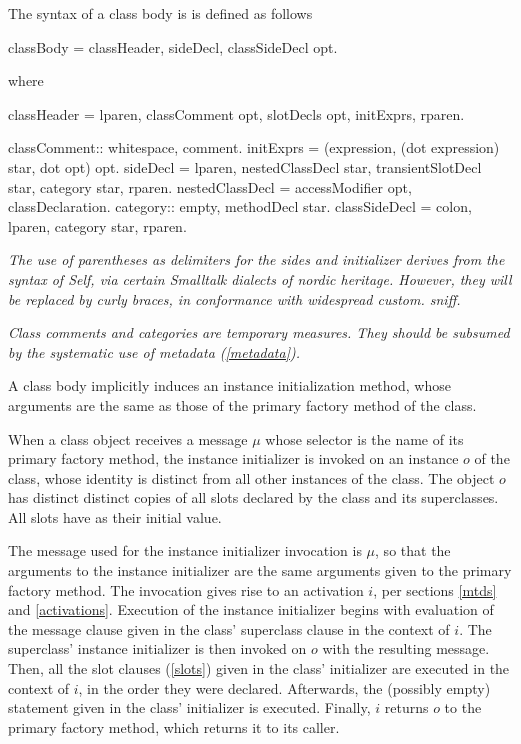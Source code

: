 \documentclass{article}
\begin{document}
The syntax of a class body is is defined as follows


\begin{newspeak}
classBody = classHeader, sideDecl, classSideDecl opt.
\end{newspeak}
where

\begin{newspeak}
classHeader =  lparen,  classComment opt, 
                        slotDecls opt, initExprs,  rparen.   

                                             
classComment:: whitespace, comment.     
initExprs = (expression, (dot expression) star, dot opt) opt.  
sideDecl = lparen, nestedClassDecl star, transientSlotDecl star, category star, rparen.
nestedClassDecl = accessModifier opt, classDeclaration.
category:: empty, methodDecl star.
classSideDecl = colon, lparen, category star, rparen.                               
\end{newspeak}
 
 {\it
 The use of parentheses as delimiters for the sides and initializer derives from the syntax of Self, via certain Smalltalk dialects of nordic heritage. However, they will be replaced by curly braces, in conformance with widespread custom. sniff.
 }
 
{\it
 Class comments and categories are temporary measures. They should be subsumed by the systematic use of metadata (\ref{metadata}).
 }
 
A class body implicitly induces an instance initialization method, whose arguments are the same as those of the primary factory method of the class.
 
When a class object receives a message $\mu$ whose selector is the name of its primary factory method, the instance initializer is invoked on an instance $o$ of the class, whose identity is distinct from all other instances of the class. The object $o$ has distinct distinct copies of all slots declared by the class and its superclasses. All slots have \NIL{} as their initial value. 

The message used for the instance initializer invocation is $\mu$, so that the arguments to the instance initializer are the same arguments given to the primary factory method.  The invocation gives rise to an activation $i$, per sections \ref{mtds} and \ref{activations}.
Execution of the instance initializer begins with evaluation of the message clause given in the class' superclass clause in the context of $i$. The superclass' instance initializer is then invoked on $o$ with the resulting message.
Then, all the slot clauses (\ref{slots}) given in the class' initializer are executed in the context of $i$, in the order they were declared. Afterwards, the (possibly empty) statement given in the class' initializer is executed.
Finally, $i$ returns $o$ to the primary factory method, which returns it to its caller.
 
\end{document}
